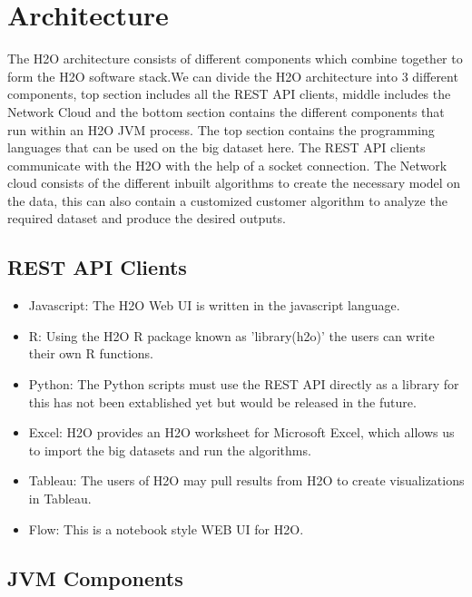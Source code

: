 \documentclass[9pt,twocolumn,twoside]{../../styles/osajnl}
\begin{document}
\section{Architecture}

The H2O architecture consists of different components which combine
together to form the H2O software stack.\newline We can divide the H2O
architecture into 3 different components, top section includes all the
REST API clients, middle includes the Network Cloud and the bottom
section contains the different components that run within an H2O JVM
process\cite{www-h2o-architecture}. The top section contains the
programming languages that can be used on the big dataset here. The
REST API clients communicate with the H2O with the help of a socket
connection\cite{www-h2o-architecture}. The Network cloud consists of
the different inbuilt algorithms to create the necessary model on the
data, this can also contain a customized customer algorithm to analyze
the required dataset and produce the desired outputs.


\subsection{REST API Clients}

\begin{itemize}
  \item Javascript: The H2O Web UI is written in the javascript language.
\item R: Using the H2O R package known as 'library(h2o)' the users can write their own R functions.
\item Python: The Python scripts must use the REST API directly as a library for this has not been extablished yet but would be released in the future.
\item Excel: H2O provides an H2O worksheet for Microsoft Excel, which allows us to import the big datasets and run the algorithms.
\item Tableau: The users of H2O may pull results from H2O to create visualizations in Tableau.
\item Flow: This is a notebook style WEB UI for H2O\cite{www-h2o-architecture}.
\end{itemize}

\subsection{JVM Components}
\end{document}

